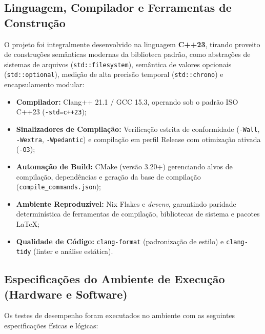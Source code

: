 \documentclass[12pt,a4paper]{article}
\begin{document}
\subsection{Linguagem, Compilador e Ferramentas de Construção}
O projeto foi integralmente desenvolvido na linguagem \textbf{C++23}, tirando proveito de construções semânticas modernas da biblioteca padrão, como abstrações de sistemas de arquivos (\texttt{std::filesystem}), semântica de valores opcionais (\texttt{std::optional}), medição de alta precisão temporal (\texttt{std::chrono}) e encapsulamento modular:
\begin{itemize}
    \item \textbf{Compilador:} Clang++ 21.1 / GCC 15.3, operando sob o padrão ISO C++23 (\texttt{-std=c++23});
    \item \textbf{Sinalizadores de Compilação:} Verificação estrita de conformidade (\texttt{-Wall}, \texttt{-Wextra}, \texttt{-Wpedantic}) e compilação em perfil Release com otimização ativada (\texttt{-O3});
    \item \textbf{Automação de Build:} CMake (versão 3.20+) gerenciando alvos de compilação, dependências e geração da base de compilação (\texttt{compile\_commands.json});
    \item \textbf{Ambiente Reproduzível:} Nix Flakes e \textit{devenv}, garantindo paridade determinística de ferramentas de compilação, bibliotecas de sistema e pacotes \LaTeX{};
    \item \textbf{Qualidade de Código:} \texttt{clang-format} (padronização de estilo) e \texttt{clang-tidy} (linter e análise estática).
\end{itemize}

\subsection{Especificações do Ambiente de Execução (Hardware e Software)}
Os testes de desempenho foram executados no ambiente com as seguintes especificações físicas e lógicas:
\end{document}
